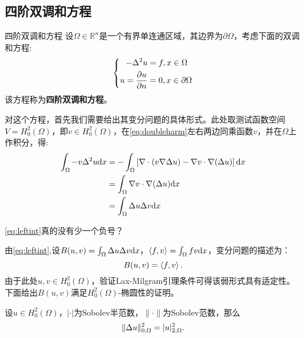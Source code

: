 \subsection{四阶双调和方程}
\begin{definition}{四阶双调和方程}
  设$\Omega\in\mathbb{R}^{n}$是一个有界单连通区域，其边界为$\partial\Omega$，考虑下面的双调和方程:
  \begin{equation}
    \label{eq:doubleharm}
    \left\{
      \begin{aligned}
        -\Delta^{2}u&=f,x\in\Omega\\
        u=\frac{\partial u}{\partial n}&=0,x\in\partial\Omega\\
      \end{aligned}
    \right.
  \end{equation}
  该方程称为\textbf{四阶双调和方程}。
\end{definition}
对这个方程，首先我们需要给出其变分问题的具体形式。此处取测试函数空间$V=H_{0}^{2}(\Omega)$，即$v\in H_{0}^{2}(\Omega)$，在\eqref{eq:doubleharm}左右两边同乘函数$v$，并在$\Omega$上作积分，得:
\begin{equation}
    \label{eq:leftint}
    \begin{aligned}
        \int_{\Omega}-v\Delta^2 u\mathrm{d} x&=-\int_{\Omega}\left[\nabla\cdot(v\nabla\Delta u)-\nabla v\cdot\nabla(\Delta u)\right]\mathrm{d} x\\
        &=\int_{\Omega}\nabla v\cdot\nabla(\Delta u)\mathrm{d} x\\
        &=\int_{\Omega}\Delta u\Delta v\mathrm{d} x\\
    \end{aligned}
\end{equation}
\begin{remark}
    \eqref{eq:leftint}真的没有少一个负号？
\end{remark}
由\eqref{eq:leftint},设$B(u,v)=\int_{\Omega}\Delta u\Delta v\mathrm{d} x$，$\left<f,v\right>=\int_{\Omega}fv\mathrm{d} x$，变分问题的描述为：
\begin{equation}
    \label{eq:bianfenharm}
    B(u,v)=\left<f,v\right>.
\end{equation}
由于此处$u,v\in H_{0}^{2}(\Omega)$，验证Lax-Milgram引理条件可得该弱形式具有适定性。下面给出$B(u,v)$满足$H_{0}^{2}(\Omega)$-椭圆性的证明。
\begin{lemma}
    \label{lem:normequiv}
    设$u\in H_{0}^{2}(\Omega)$，$|\cdot|$为Sobolev半范数，$\|\cdot\|$为Sobolev范数，那么
    \begin{equation}
        \|\Delta u\|_{0,\Omega}^{2}=|u|_{2,\Omega}^{2}.
    \end{equation}
\end{lemma}

